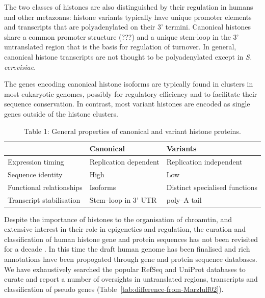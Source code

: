 \documentclass[10pt,a4paper,draft,article]{memoir}
\begin{document}
    The two classes of histones are also distinguished by their regulation in humans and other
    metazoans: histone variants typically have unique promoter elements and transcripts that
    are polyadenylated on their 3' termini.  Canonical
    histones share a common promoter structure (???) and a unique stem-loop in the 3' untranslated
    region that is the basis for regulation of turnover. In general, canonical histone transcripts
    are not thought to be polyadenylated except in \textit{S. cerevisiae}.

    The genes encoding canonical histone isoforms are typically found in clusters in most eukaryotic
    genomes, possibly for regulatory efficiency and to facilitate their sequence conservation. In
    contrast, most variant histones are encoded as single genes outside of the histone clusters.

    \begin{table}
      \caption{Table 1: General properties of canonical and variant histone proteins.}
      \label{tab:typical-histone-differences}
      \centering
      \begin{tabular}{l l l}
        \toprule
        \null                     & Canonical             & Variants \\
        \midrule
        Expression timing         & Replication dependent & Replication independent \\
        Sequence identity         & High                  & Low \\
        Functional relationships  & Isoforms              & Distinct specialised functions \\
        Transcript stabilisation  & Stem--loop in 3' UTR  & poly--A tail \\
        \bottomrule
      \end{tabular}
    \end{table}

    Despite the importance of histones to the organisation of chroamtin, and extensive interest
    in their role in epigenetics and regulation, the curation and classification of human histone
    gene and protein sequences has not been revisited for a decade \cite{Marzluff02}. In this time
    the draft human genome has been finalised and rich annotations have been propogated through gene
    and protein sequence databases. We have exhaustively searched the popular RefSeq and UniProt
    databases to curate and report a number of oversights in untranslated regions, transcripts and
    classification of pseudo genes (Table~\ref{tab:difference-from-Marzluff02}).
\end{document}
